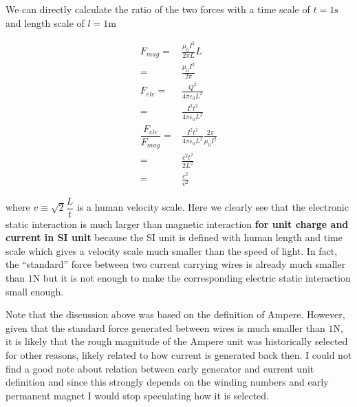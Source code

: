 \documentclass[10pt,fleqn]{article}
\newcommand{\eqar}[1]
{
  \begin{align*}
    #1
  \end{align*}
}
\begin{document}
We can directly calculate the ratio of the two forces with a time scale of $t=1\mathrm{s}$
and length scale of $l=1\mathrm{m}$
\eqar{
  F_{mag}=&\frac{\mu_0 I^2}{2\pi L}L\\
  =&\frac{\mu_0 I^2}{2\pi}\\
  F_{ele}=&\frac{Q^2}{4\pi\varepsilon_0 L^2}\\
  =&\frac{I^2t^2}{4\pi\varepsilon_0 L^2}\\
  \dfrac{F_{ele}}{F_{mag}}=&\frac{I^2t^2}{4\pi\varepsilon_0 L^2}\frac{2\pi}{\mu_0 I^2}\\
  =&\frac{c^2t^2}{2L^2}\\
  =&\frac{c^2}{v^2}
}
where $v\equiv\sqrt{2}\dfrac{L}{t}$ is a human velocity scale.
Here we clearly see that the electronic static interaction is much larger than
magnetic interaction \textbf{for unit charge and current in SI unit} because
the SI unit is defined with human length and time scale which gives a velocity scale
much smaller than the speed of light. In fact, the ``standard'' force between
two current carrying wires is already much smaller than $1\mathrm{N}$ but it is not enough
to make the corresponding electric static interaction small enough.

Note that the discussion above was based on the definition of Ampere.
However, given that the standard force generated between wires is much smaller than $1\mathrm{N}$,
it is likely that the rough magnitude of the Ampere unit was historically selected
for other reasons, likely related to how current is generated back then.
I could not find a good note about relation between early generator and
current unit definition and since this strongly depends on the winding numbers and
early permanent magnet I would stop speculating how it is selected.
\end{document}
